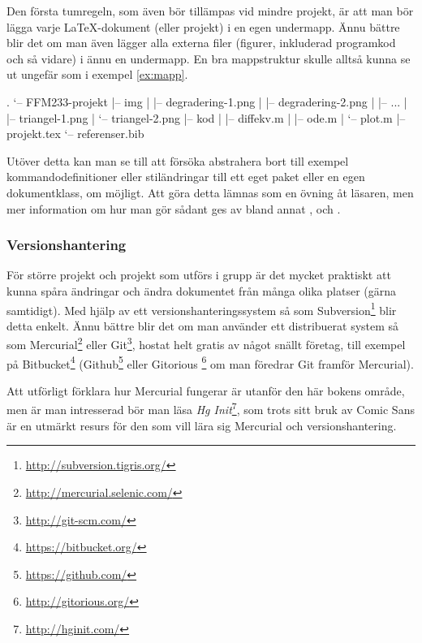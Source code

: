 \documentclass[../../latex.tex]{subfiles}
\begin{document}
Den första tumregeln, som även bör tillämpas vid mindre projekt, är att
man bör lägga varje \LaTeX-dokument (eller projekt) i en egen undermapp.
Ännu bättre blir det om man även lägger alla externa filer (figurer,
inkluderad programkod och så vidare) i ännu en undermapp. En bra
mappstruktur skulle alltså kunna se ut ungefär som i exempel
\vref{ex:mapp}.

\begin{kod}
	\begin{textcode}
.
`-- FFM233-projekt
|-- img
|   |-- degradering-1.png
|   |-- degradering-2.png
|   |-- ...
|   |-- triangel-1.png
|   `-- triangel-2.png
|-- kod
|   |-- diffekv.m
|   |-- ode.m
|   `-- plot.m
|-- projekt.tex
`-- referenser.bib
	\end{textcode}
	\caption{En bra mappstruktur för ett enkelt \LaTeX-projekt.}
	\label{ex:mapp}
\end{kod}

Utöver detta kan man se till att försöka abstrahera bort till exempel
kommandodefinitioner eller stiländringar till ett eget paket eller en
egen dokumentklass, om möjligt. Att göra detta lämnas som en övning åt
läsaren, men mer information om hur man gör sådant ges av bland annat
,  och .

\subsubsection{Versionshantering}
För större projekt och projekt som utförs i grupp är det mycket praktiskt
att kunna spåra ändringar och ändra dokumentet från många olika platser
(gärna samtidigt). Med hjälp av ett versionshanteringssystem så som 
Subversion\footnote{\url{http://subversion.tigris.org/}} blir detta
enkelt. Ännu bättre blir det om man använder ett distribuerat system så
som Mercurial\footnote{\url{http://mercurial.selenic.com/}} eller
Git\footnote{\url{http://git-scm.com/}}, hostat helt gratis av något snällt
företag, till exempel på Bitbucket\footnote{\url{https://bitbucket.org/}}
(Github\footnote{\url{https://github.com/}} eller Gitorious%
\footnote{\url{http://gitorious.org/}} om man föredrar Git framför Mercurial).

\newpage
Att utförligt förklara hur Mercurial fungerar är utanför den här bokens
område, men är man intresserad bör man läsa
\emph{Hg Init}\footnote{\url{http://hginit.com/}}, som trots sitt bruk av
Comic Sans är en utmärkt resurs för den som vill lära sig Mercurial och
versionshantering.
\end{document}
